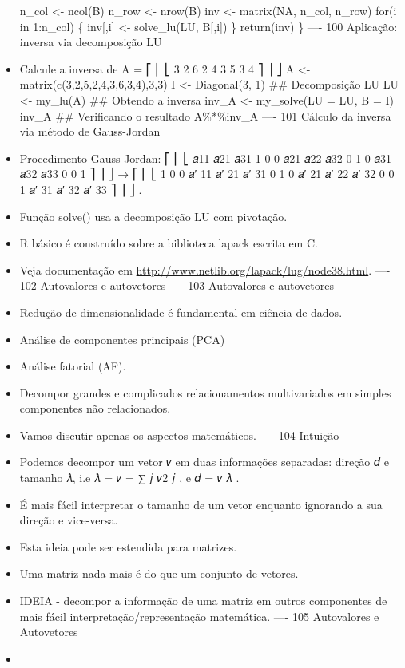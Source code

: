 \documentclass[
]{article}
\begin{document}
\begin{itemize}
  n\_col \textless- ncol(B) n\_row \textless- nrow(B) inv \textless-
  matrix(NA, n\_col, n\_row) for(i in 1:n\_col) \{ inv{[},i{]}
  \textless- solve\_lu(LU, B{[},i{]}) \} return(inv) \} ---- 100
  Aplicação: inversa via decomposição LU
\item
  Calcule a inversa de A = ⎡ ⎢ ⎣ 3 2 6 2 4 3 5 3 4 ⎤ ⎥ ⎦ A \textless-
  matrix(c(3,2,5,2,4,3,6,3,4),3,3) I \textless- Diagonal(3, 1) \#\#
  Decomposição LU LU \textless- my\_lu(A) \#\# Obtendo a inversa inv\_A
  \textless- my\_solve(LU = LU, B = I) inv\_A \#\# Verificando o
  resultado A\%*\%inv\_A ---- 101 Cálculo da inversa via método de
  Gauss-Jordan
\item
  Procedimento Gauss-Jordan: ⎡ ⎢ ⎣ 𝑎11 𝑎21 𝑎31 1 0 0 𝑎21 𝑎22 𝑎32 0 1 0
  𝑎31 𝑎32 𝑎33 0 0 1 ⎤ ⎥ ⎦ → ⎡ ⎢ ⎣ 1 0 0 𝑎′ 11 𝑎′ 21 𝑎′ 31 0 1 0 𝑎′ 21 𝑎′
  22 𝑎′ 32 0 0 1 𝑎′ 31 𝑎′ 32 𝑎′ 33 ⎤ ⎥ ⎦ .
\item
  Função solve() usa a decomposição LU com pivotação.
\item
  R básico é construído sobre a biblioteca lapack escrita em C.
\item
  Veja documentação em
  \url{http://www.netlib.org/lapack/lug/node38.html}. ---- 102
  Autovalores e autovetores ---- 103 Autovalores e autovetores
\item
  Redução de dimensionalidade é fundamental em ciência de dados.
\item
  Análise de componentes principais (PCA)
\item
  Análise fatorial (AF).
\item
  Decompor grandes e complicados relacionamentos multivariados em
  simples componentes não relacionados.
\item
  Vamos discutir apenas os aspectos matemáticos. ---- 104 Intuição
\item
  Podemos decompor um vetor 𝑣 em duas informações separadas: direção 𝑑 e
  tamanho 𝜆, i.e 𝜆 = \textbar\textbar 𝑣\textbar\textbar{} = \sqr∑ 𝑗 𝜈2 𝑗
  , e 𝑑 = 𝑣 𝜆 .
\item
  É mais fácil interpretar o tamanho de um vetor enquanto ignorando a
  sua direção e vice-versa.
\item
  Esta ideia pode ser estendida para matrizes.
\item
  Uma matriz nada mais é do que um conjunto de vetores.
\item
  IDEIA - decompor a informação de uma matriz em outros componentes de
  mais fácil interpretação/representação matemática. ---- 105
  Autovalores e Autovetores
\item

\end{itemize}
\end{document}
